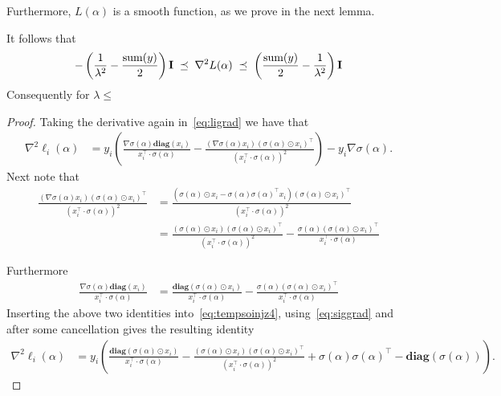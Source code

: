 \documentclass[11pt]{article}
\newcommand{\diag}[1]{\mathbf{diag}\left( #1\right)}
\newcommand{\mI}{{\bf I}}
\begin{document}
Furthermore, $L(\alpha)$ is a smooth function, as we prove in the next lemma.
\begin{lemma}
It follows that 
\begin{equation}\label{eq:Lhess}
-\left(\frac{1}{\lambda^2}-\frac{ \mbox{sum}(y)}{2}\right)  \mI  \; \preceq \; \nabla^2 L(\alpha) \; \preceq \; \left(\frac{ \mbox{sum}(y)}{2}-\frac{1}{\lambda^2} \right) \mI
\end{equation}
Consequently for $\lambda \leq$
\end{lemma}
\begin{proof}
Taking the derivative again in~\eqref{eq:ligrad} we have that
\begin{align}
\nabla^2 \ell_i(\alpha) & =   y_i \left(\frac{\nabla \sigma(\alpha)  \diag{ x_i}}{ x_i^{\top} \cdot \sigma(\alpha) } - \frac{ (\nabla \sigma(\alpha) x_i)(\sigma(\alpha)  \odot x_i)^\top}{( x_i^{\top} \cdot \sigma(\alpha) )^2}  \right) -y_i\nabla \sigma(\alpha). \label{eq:tempsoinjz4}
\end{align}
    Next note that 
    \begin{align*}
        \frac{ (\nabla \sigma(\alpha) x_i)(\sigma(\alpha)  \odot x_i)^\top}{( x_i^{\top} \cdot \sigma(\alpha) )^2} & = \frac{ (\sigma(\alpha) \odot x_i - \sigma(\alpha)  \sigma(\alpha) ^\top x_i )(\sigma(\alpha)  \odot x_i)^\top}{( x_i^{\top} \cdot \sigma(\alpha) )^2} \\
        &= \frac{ (\sigma(\alpha) \odot x_i) (\sigma(\alpha) \odot x_i)^\top  }{( x_i^{\top} \cdot \sigma(\alpha) )^2} - \frac{\sigma(\alpha) (\sigma(\alpha) \odot x_i)^\top } { x_i^{\top} \cdot \sigma(\alpha) }
    \end{align*}

Furthermore
\begin{align*}
    \frac{\nabla \sigma(\alpha)  \diag{ x_i}}{ x_i^{\top} \cdot \sigma(\alpha) } & = \frac{  \diag{\sigma(\alpha)\odot x_i}}{ x_i^{\top} \cdot \sigma(\alpha) } -\frac{\sigma(\alpha) (\sigma(\alpha) \odot x_i)^\top }{ x_i^{\top} \cdot \sigma(\alpha) }
\end{align*}
Inserting the above two identities into~\eqref{eq:tempsoinjz4}, using~\eqref{eq:siggrad} and after some cancellation gives the resulting identity
\begin{align}
\nabla^2 \ell_i(\alpha)& = y_i \left(\frac{  \diag{\sigma(\alpha)\odot x_i}  }{ x_i^{\top} \cdot \sigma(\alpha) } -\frac{ (\sigma(\alpha) \odot x_i) (\sigma(\alpha) \odot x_i)^\top  }{( x_i^{\top} \cdot \sigma(\alpha) )^2}  +\sigma(\alpha)\sigma(\alpha)^\top - \diag{\sigma(\alpha)}\right). \label{eq:tempsoinjz4}
\end{align}


\end{proof}
\end{document}
